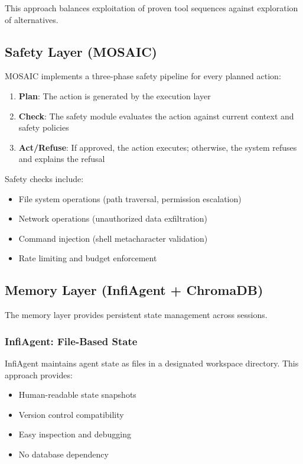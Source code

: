 \documentclass[12pt,a4paper]{article}
\begin{document}
This approach balances exploitation of proven tool sequences against exploration of alternatives.

\subsection{Safety Layer (MOSAIC)}

MOSAIC implements a three-phase safety pipeline for every planned action:

\begin{enumerate}
    \item \textbf{Plan}: The action is generated by the execution layer
    \item \textbf{Check}: The safety module evaluates the action against current context and safety policies
    \item \textbf{Act/Refuse}: If approved, the action executes; otherwise, the system refuses and explains the refusal
\end{enumerate}

Safety checks include:
\begin{itemize}
    \item File system operations (path traversal, permission escalation)
    \item Network operations (unauthorized data exfiltration)
    \item Command injection (shell metacharacter validation)
    \item Rate limiting and budget enforcement
\end{itemize}

\subsection{Memory Layer (InfiAgent + ChromaDB)}

The memory layer provides persistent state management across sessions.

\subsubsection{InfiAgent: File-Based State}

InfiAgent maintains agent state as files in a designated workspace directory. This approach provides:
\begin{itemize}
    \item Human-readable state snapshots
    \item Version control compatibility
    \item Easy inspection and debugging
    \item No database dependency
\end{itemize}
\end{document}
